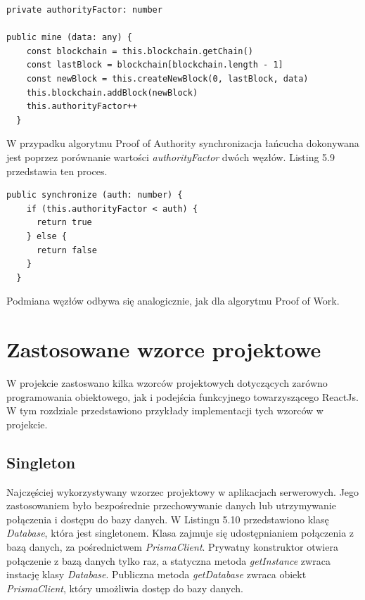 \documentclass[a4paper,12pt]{book}
\begin{document}
\begin{lstlisting}[style=ES6, caption={Dodawanie nowego bloku w algorytmie Proof of Authority.}]
private authorityFactor: number

public mine (data: any) {
    const blockchain = this.blockchain.getChain()
    const lastBlock = blockchain[blockchain.length - 1]
    const newBlock = this.createNewBlock(0, lastBlock, data)
    this.blockchain.addBlock(newBlock)
    this.authorityFactor++
  }
\end{lstlisting}

W przypadku algorytmu Proof of Authority synchronizacja łańcucha dokonywana jest poprzez porównanie wartości \textit{authorityFactor} dwóch węzłów. Listing 5.9 przedstawia ten proces.

\begin{lstlisting}[style=ES6, caption={Synchronizacja w algorytmi Proof of Authority.}]
public synchronize (auth: number) {
    if (this.authorityFactor < auth) {
      return true
    } else {
      return false
    }
  }
\end{lstlisting}

Podmiana węzłów odbywa się analogicznie, jak dla algorytmu Proof of Work.
\section{Zastosowane wzorce projektowe}
W projekcie zastoswano kilka wzorców projektowych dotyczących zarówno programowania obiektowego, jak i podejścia funkcyjnego towarzyszącego ReactJs. W tym rozdziale przedstawiono przykłady implementacji tych wzorców w projekcie.

\subsection{Singleton}
Najczęściej wykorzystywany wzorzec projektowy w aplikacjach serwerowych. Jego zastosowaniem było bezpośrednie przechowywanie danych lub utrzymywanie połączenia i dostępu do bazy danych. W Listingu 5.10 przedstawiono klasę \textit{Database}, która jest singletonem. Klasa zajmuje się udostępnianiem połączenia z bazą danych, za pośrednictwem \textit{PrismaClient}. Prywatny konstruktor otwiera połączenie z bazą danych tylko raz, a statyczna metoda \textit{getInstance} zwraca instację klasy \textit{Database}. Publiczna metoda \textit{getDatabase} zwraca obiekt \textit{PrismaClient}, który umożliwia dostęp do bazy danych.
\end{document}
